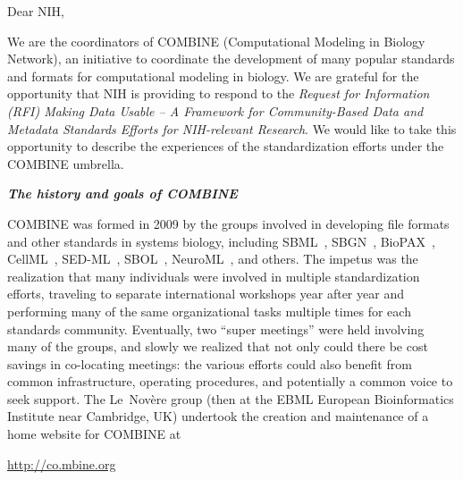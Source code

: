 

\newcommand{\eg}{e.g.,\xspace}
\newcommand{\idorg}{\href{http://identifiers.org}{\texttt{Identifiers.org}}\xspace}


Dear NIH,

We are the coordinators of COMBINE (Computational Modeling in Biology Network), an initiative to coordinate the development of many popular standards and formats for computational modeling in biology.  We are grateful for the opportunity that NIH is providing to respond to the \emph{Request for Information (RFI) Making Data Usable -- A Framework for Community-Based Data and Metadata Standards Efforts for NIH-relevant Research}.  We would like to take this opportunity to describe the experiences of the standardization efforts under the COMBINE umbrella.

\textbf{\textsl{The history and goals of COMBINE}}

COMBINE was formed in 2009 by the groups involved in developing file formats and other standards in systems biology, including SBML~\cite{hucka_2003, hucka_2004, hucka_2010}, SBGN~\cite{lenovere_2009}, BioPAX~\cite{demir_2010}, CellML~\cite{cuellar_2003, hedley_2001b}, SED-ML~\cite{waltemath_2011, springerlink:10.1007/978354088562715}, SBOL~\cite{galdzicki_2014}, NeuroML~\cite{gleeson_2010, neuroml_2014}, and others.  The impetus was the realization that many individuals were involved in multiple standardization efforts, traveling to separate international workshops year after year and performing many of the same organizational tasks multiple times for each standards community.  Eventually, two ``super meetings'' were held involving many of the groups, and slowly we realized that not only could there be cost savings in co-locating meetings: the various efforts could also benefit from common infrastructure, operating procedures, and potentially a common voice to seek support.  The Le~Nov\`{e}re group (then at the EBML European Bioinformatics Institute near Cambridge, UK) undertook the creation and maintenance of a home website for COMBINE at
\begin{center}\vspace*{-0.75em}
  \url{http://co.mbine.org}
\end{center}\vspace*{-0.75em}

